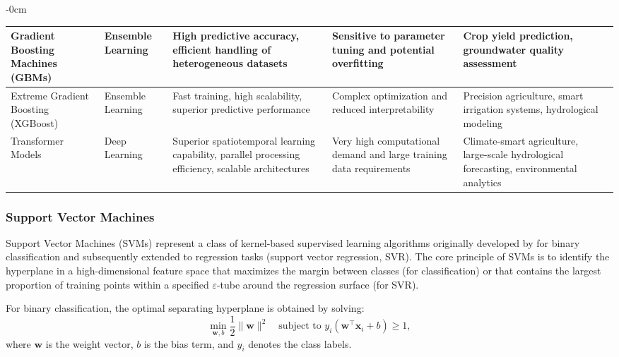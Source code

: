\documentclass[land,review,accept,pdftex,oneauthor]{Definitions/mdpi}
\begin{document}
\begin{table}[H]
\begin{adjustwidth}{-\extralength}{0cm}
\begin{minipage}{\fulllength}
\begin{tabularx}{\textwidth}{m{2.4cm}<{\raggedright}m{2cm}<{\raggedright}m{3.2cm}<{\raggedright}m{3.2cm}<{\raggedright}m{3.2cm}<{\raggedright}m{1.8cm}<{\raggedright}}
Gradient Boosting Machines (GBMs) &
Ensemble Learning &
High predictive accuracy, efficient handling of heterogeneous datasets &
Sensitive to parameter tuning and potential overfitting &
Crop yield prediction, groundwater quality assessment &
\citep{Subudhi,Friedman2001,Natekin2013,Elith2008} \\ 
\midrule

Extreme Gradient Boosting (XGBoost) &
Ensemble Learning &
Fast training, high scalability, superior predictive performance &
Complex optimization and reduced interpretability &
Precision agriculture, smart irrigation systems, hydrological modeling &
\citep{Chen2016,rs17132129,Ghiat,Benassi} \\
\midrule

Transformer Models &
Deep Learning &
Superior spatiotemporal learning capability, parallel processing efficiency, scalable architectures &
Very high computational demand and large training data requirements &
Climate-smart agriculture, large-scale hydrological forecasting, environmental analytics &
\citep{Devlin2018,Wu2021_Trans,Nguyen} \\

\bottomrule
\end{tabularx}
\end{minipage}
\end{adjustwidth}
\end{table}

\subsubsection{Support Vector Machines}

Support Vector Machines (SVMs) represent a class of kernel-based supervised learning algorithms originally developed by \citet{cortes1995support} for binary classification and subsequently extended to regression tasks (support vector regression, SVR). The core principle of SVMs is to identify the hyperplane in a high-dimensional feature space that maximizes the margin between classes (for classification) or that contains the largest proportion of training points within a specified $\varepsilon$-tube around the regression surface (for SVR).

For binary classification, the optimal separating hyperplane is obtained by solving:
\begin{equation}
\min_{\mathbf{w},b} \frac{1}{2}\|\mathbf{w}\|^2
\quad
\text{subject to }
y_i(\mathbf{w}^\top \mathbf{x}_i+b)\geq 1,
\end{equation}
where $\mathbf{w}$ is the weight vector, $b$ is the bias term, and $y_i$ denotes the class labels.
\end{document}
